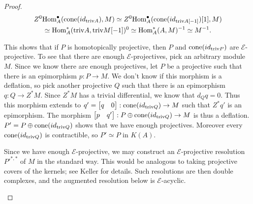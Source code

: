 \documentclass[../thesis.tex]{subfiles}
\begin{document}
\begin{proof}
                \begin{multline*}
                    Z^0\tt{Hom}_A^\bullet (\tt{cone}(id_{\tt{triv}A}), M) \simeq Z^0\tt{Hom}_A^\bullet (\tt{cone}(id_{\tt{triv}A[-1]})[1], M) \\ \simeq \tt{Hom}_A^*(\tt{triv}A, \tt{triv}M[-1])^0 \simeq \tt{Hom}_A^*(A, M)^{-1} \simeq M^{-1}\tt{.}
                \end{multline*}

                This shows that if $P$ is homotopically projective, then $P$ and $\tt{cone}(id_{\tt{triv}P})$ are $\mathcal{E}$-projective. To see that there are enough $\mathcal{E}$-projectives, pick an arbitrary module $M$. Since we know there are enough projectives, let $P$ be a projective such that there is an epimorphism $p : P \rightarrow M$. We don't know if this morphism is a deflation, so pick another projective $Q$ such that there is an epimorphism $q: Q \rightarrow Z^*M$. Since $Z^*M$ has a trivial differential, we know that $d_Qq = 0$. Thus this morphism extends to $q' = \begin{bmatrix}
                    q & 0
                \end{bmatrix} : \tt{cone}(id_{\tt{triv}Q}) \rightarrow M$ such that $Z^*q'$ is an epimorphism. The morphism $\begin{bmatrix}
                    p & q'
                \end{bmatrix} : P \oplus \tt{cone}(id_{\tt{triv}Q}) \rightarrow M$ is thus a deflation. $P' = P \oplus \tt{cone}(id_{\tt{triv}Q})$ shows that we have enough projectives. Moreover every $\tt{cone}(id_{\tt{triv}Q})$ is contractible, so $P' \simeq P$ in $K(A)$.

                Since we have enough $\mathcal{E}$-projective, we may construct an $\mathcal{E}$-projective resolution $P'^{*,*}$ of $M$ in the standard way. This would be analogous to taking projective covers of the kernels; see Keller \cite{Keller90} for details. Such resolutions are then double complexes, and the augmented resolution below is $\mathcal{E}$-acyclic.

                \begin{center}
                \end{center} 
                

\end{proof}
\end{document}
